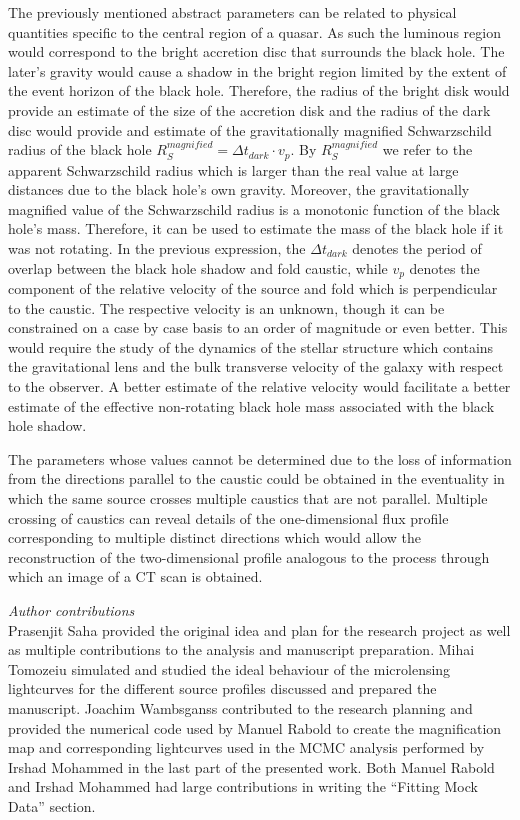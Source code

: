 \documentclass[usenatbib]{mn2e}
\begin{document}
The previously mentioned abstract parameters can be related to
physical quantities specific to the central region of a quasar.  As
such the luminous region would correspond to the bright accretion disc
that surrounds the black hole. The later's gravity would cause a
shadow in the bright region limited by the extent of the event horizon
of the black hole. Therefore, the radius of the bright disk would
provide an estimate of the size of the accretion disk and the radius
of the dark disc would provide and estimate of the gravitationally
magnified Schwarzschild radius of the black hole $R_{S}^{magnified} =
\Delta t_{dark} \cdot v_p$.  By $R_{S}^{magnified}$ we refer to the
apparent Schwarzschild radius which is larger than the real value at
large distances due to the black hole's own gravity.  Moreover, the
gravitationally magnified value of the Schwarzschild radius is a
monotonic function of the black hole's mass. Therefore, it can be used
to estimate the mass of the black hole if it was not rotating. In the
previous expression, the $\Delta t_{dark}$ denotes the period of
overlap between the black hole shadow and fold caustic, while $v_p$
denotes the component of the relative velocity of the source and fold
which is perpendicular to the caustic.  The respective velocity is an
unknown, though it can be constrained on a case by case basis to an
order of magnitude or even better. This would require the study of the
dynamics of the stellar structure which contains the gravitational
lens and the bulk transverse velocity of the galaxy with respect to
the observer.  A better estimate of the relative velocity would
facilitate a better estimate of the effective non-rotating black hole
mass associated with the black hole shadow.

    
The parameters whose values cannot be determined due to the 
loss of information from the directions parallel to the 
caustic could be obtained in the eventuality in which 
the same source crosses multiple caustics that are not parallel. 
Multiple crossing of caustics can reveal details of 
the one-dimensional flux profile corresponding to multiple distinct 
directions which would allow the reconstruction of the 
two-dimensional profile analogous to the process through 
which an image of a CT scan is obtained.  

\textit{Author contributions}\\
Prasenjit Saha provided the original idea and plan for the research project as well as multiple contributions to the analysis 
and manuscript preparation. Mihai Tomozeiu simulated and studied the ideal behaviour of the microlensing lightcurves for the 
different source profiles discussed and prepared the manuscript.
Joachim Wambsganss contributed to the research planning and provided the numerical code used by Manuel Rabold to create 
the magnification map and corresponding lightcurves used in the MCMC analysis performed by Irshad Mohammed in the last 
part of the presented work. Both Manuel Rabold and Irshad Mohammed had large contributions in writing the ``Fitting Mock Data'' section.
\end{document}
